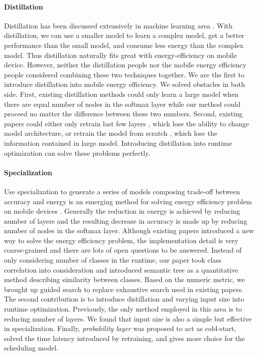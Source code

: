 \documentclass[pageno]{jpaper}
\begin{document}
\paragraph{Distillation}
Distillation has been discussed extensively in machine learning area \cite{hinton2015distilling, ba2014deep, dauphin2013big, chen2017learning, lopez2015unifying, kim2015compression,bucilu2006model}. With distillation, we can use a smaller model to learn a complex model, get a better performance than the small model, and consume less energy than the complex model. Thus distillation naturally fits great with energy-efficiency on mobile device. However, neither the distillation people nor the mobile energy efficiency people considered combining these two techniques together. We are the first to introduce distillation into mobile energy efficiency. We solved obstacles in both side. First, existing distillation methods could only learn a large model when there are equal number of nodes in the softmax layer while our method could proceed no matter the difference between these two numbers. Second, existing papers could either only retrain last few layers \cite{li2015towards}, which lose the ability to change model architecture, or retrain the model from scratch \cite{han2016mcdnn, kang2017noscope, shen2016fast}, which lose the information contained in large model. Introducing distillation into runtime optimization can solve these problems perfectly.

\paragraph{Specialization}
Use specialization to generate a series of models composing trade-off between accuracy and energy is an emerging method for solving energy efficiency problem on mobile devices \cite{han2016mcdnn, kang2017noscope, shen2016fast}. Generally the reduction in energy is achieved by reducing number of layers and the resulting decrease in accuracy is made up by reducing number of nodes in the softmax layer. Although existing papers introduced a new way to solve the energy efficiency problem, the implementation detail is very coarse-grained and there are lots of open questions to be answered. Instead of only considering number of classes in the runtime, our paper took class correlation into consideration and introduced semantic tree as a quantitative method describing similarity between classes. Based on the numeric metric, we brought up guided search to replace exhaustive search used in existing papers. The second contribution is to introduce distillation and varying input size into runtime optimization. Previously, the only method employed in this area is to reducing number of layers. We found that input size is also a simple but effective in specialization. Finally, \textit{probability layer} was proposed to act as cold-start, solved the time latency introduced by retraining, and gives more choice for the scheduling model.
\end{document}
